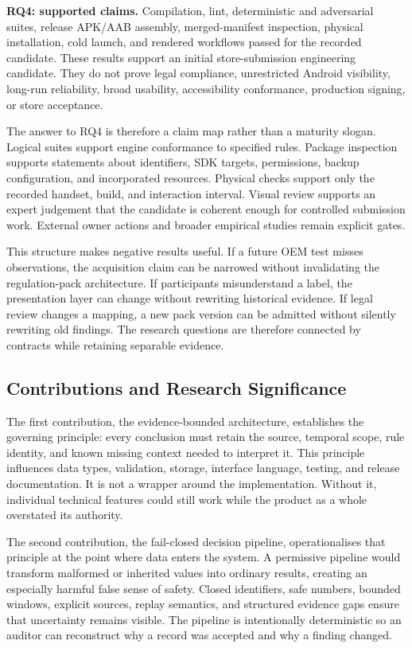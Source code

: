 \textbf{RQ4: supported claims.} Compilation, lint, deterministic and adversarial suites, release APK/AAB assembly, merged-manifest inspection, physical installation, cold launch, and rendered workflows passed for the recorded candidate. These results support an initial store-submission engineering candidate. They do not prove legal compliance, unrestricted Android visibility, long-run reliability, broad usability, accessibility conformance, production signing, or store acceptance.

The answer to RQ4 is therefore a claim map rather than a maturity slogan. Logical suites support engine conformance to specified rules. Package inspection supports statements about identifiers, SDK targets, permissions, backup configuration, and incorporated resources. Physical checks support only the recorded handset, build, and interaction interval. Visual review supports an expert judgement that the candidate is coherent enough for controlled submission work. External owner actions and broader empirical studies remain explicit gates.

This structure makes negative results useful. If a future OEM test misses observations, the acquisition claim can be narrowed without invalidating the regulation-pack architecture. If participants misunderstand a label, the presentation layer can change without rewriting historical evidence. If legal review changes a mapping, a new pack version can be admitted without silently rewriting old findings. The research questions are therefore connected by contracts while retaining separable evidence.

\subsection{Contributions and Research Significance}

The first contribution, the evidence-bounded architecture, establishes the governing principle: every conclusion must retain the source, temporal scope, rule identity, and known missing context needed to interpret it. This principle influences data types, validation, storage, interface language, testing, and release documentation. It is not a wrapper around the implementation. Without it, individual technical features could still work while the product as a whole overstated its authority.

The second contribution, the fail-closed decision pipeline, operationalises that principle at the point where data enters the system. A permissive pipeline would transform malformed or inherited values into ordinary results, creating an especially harmful false sense of safety. Closed identifiers, safe numbers, bounded windows, explicit sources, replay semantics, and structured evidence gaps ensure that uncertainty remains visible. The pipeline is intentionally deterministic so an auditor can reconstruct why a record was accepted and why a finding changed.

